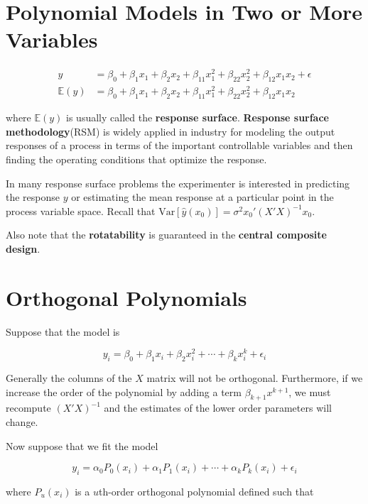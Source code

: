 \documentclass[12pt]{article}
\begin{document}
\section{Polynomial Models in Two or More Variables}

$$
\begin{aligned}
y &= \beta_0 + \beta_1 x_1 + \beta_2 x_2 + \beta_{11} x_1^2 + \beta_{22} x_2^2 + \beta_{12}x_1x_2 + \epsilon \\[10pt]
\mathbb{E}(y) &= \beta_0 + \beta_1 x_1 + \beta_2 x_2 + \beta_{11} x_1^2 + \beta_{22} x_2^2 + \beta_{12}x_1x_2
\end{aligned}
$$

where $\mathbb{E}(y)$ is usually called the \textbf{response surface}. \textbf{Response surface methodology}(RSM) is widely applied in industry for modeling the output responses of a process in terms of the important controllable variables and then finding the operating conditions that optimize the response. 

In many response surface problems the experimenter is interested in predicting the response $y$ or estimating the mean response at a particular point in the process variable space. Recall that $\mathrm{Var}[\hat{y}(x_0)] = \sigma^2 x_0' (X'X)^{-1}x_0$.

Also note that the \textbf{rotatability} is guaranteed in the \textbf{central composite design}.

\section{Orthogonal Polynomials}

Suppose that the model is 

$$
y_i = \beta_0 + \beta_1 x_i + \beta_2 x_i^2 + \cdots + \beta_k x_i^k + \epsilon_i
$$

Generally the columns of the $X$ matrix will not be orthogonal. Furthermore, if we increase the order of the polynomial by adding a term $\beta_{k+1}x^{k+1}$, we must recompute $(X′X)^{-1}$ and the estimates of the lower order parameters will change. 

Now suppose that we fit the model

$$
y_i = \alpha_0 P_0(x_i) + \alpha_1 P_1(x_i) + \cdots + \alpha_k P_k(x_i) + \epsilon_i
$$

where $P_u(x_i)$ is a $u$th-order orthogonal polynomial defined such that
\end{document}
